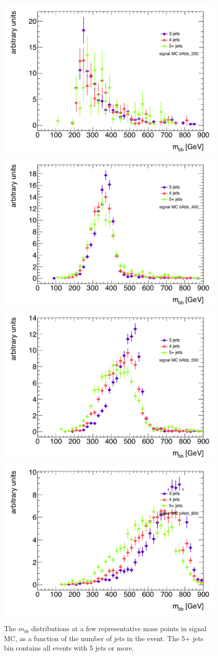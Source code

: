 \begin{figure}[hbt]
  \includegraphics[width=0.45\linewidth]{SignalKin/mbb_njets_bAbb_250.pdf}
  \includegraphics[width=0.45\linewidth]{SignalKin/mbb_njets_bAbb_400.pdf}
\newline
  \includegraphics[width=0.45\linewidth]{SignalKin/mbb_njets_bAbb_550.pdf}
  \includegraphics[width=0.45\linewidth]{SignalKin/mbb_njets_bAbb_800.pdf}
  \label{fig:mbb_njets_signal}
  \caption{The $m_{bb}$ distributions at a few representative mass points in signal MC, as a function of the number of jets in the event.  
    The 5+ jets bin contains all events with 5 jets or more.}
\end{figure}


